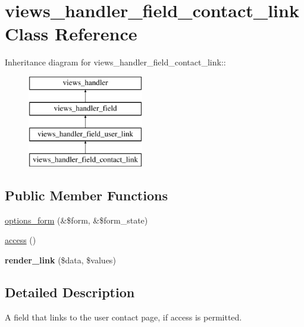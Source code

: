 \hypertarget{classviews__handler__field__contact__link}{
\section{views\_\-handler\_\-field\_\-contact\_\-link Class Reference}
\label{classviews__handler__field__contact__link}
}
Inheritance diagram for views\_\-handler\_\-field\_\-contact\_\-link::\begin{figure}[H]
\begin{center}
\leavevmode
\includegraphics[height=4cm]{classviews__handler__field__contact__link}
\end{center}
\end{figure}
\subsection*{Public Member Functions}
\begin{DoxyCompactItemize}
\item 
\hyperlink{classviews__handler__field__contact__link_ad6709f7a6f48dc51fe3952f26598e622}{options\_\-form} (\&\$form, \&\$form\_\-state)
\item 
\hyperlink{classviews__handler__field__contact__link_a5785d1771c75ad924557c3df87d6288b}{access} ()
\item 
\hypertarget{classviews__handler__field__contact__link_a94bb8bc18f9d12e41efa1034053489c6}{
{\bfseries render\_\-link} (\$data, \$values)}
\label{classviews__handler__field__contact__link_a94bb8bc18f9d12e41efa1034053489c6}

\end{DoxyCompactItemize}


\subsection{Detailed Description}
A field that links to the user contact page, if access is permitted. 

